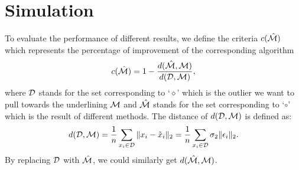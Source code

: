 \documentclass{article}
\theoremstyle{remark}
\begin{document}
\section{Simulation}
To evaluate the performance of different results, we define the criteria $c({\hat{\cal M}})$ which represents the percentage of improvement of the corresponding algorithm
\[
c({\hat{\cal M}}) = 1-\frac{d(\hat{\cal M}, {\cal M})}{d({\cal D}, {\cal M})},
\] 
where $\cal D$ stands for the set corresponding to `$\diamond$' which is the outlier we want to pull towards the underlining $\cal M$ and $\hat{\cal M}$ stands for the set corresponding to `$\circ$' which is the result of different methods. The distance of $d({\cal D}, {\cal M})$ is defined as:
\[
d({\cal D}, {\cal M}) = \frac{1}{n} \sum_{x_i\in {\cal D}} \|x_i-\tilde{x}_i\|_2 = \frac{1}{n} \sum_{x_i\in \cal D} \sigma_2\|\epsilon_i\|_2.
\] 
By replacing $\cal D$ with $\hat{\cal M}$, we could similarly get $d(\hat{\cal M}, {\cal M})$.
\end{document}
